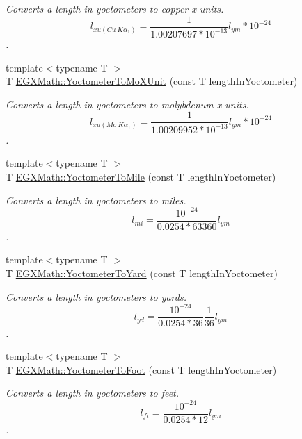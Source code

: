 \begin{DoxyCompactItemize}
\begin{DoxyCompactList}\small\item\em Converts a length in yoctometers to copper x units. \[ l_{xu(Cu\ K\alpha_1)}= \frac{1}{1.00207697*10^{-13}} l_{ym} * 10^{-24}\]. \end{DoxyCompactList}\item 
{\footnotesize template$<$typename T $>$ }\\T \mbox{\hyperlink{group___e_g_x_math-_conversions-_length_conversions-_s_i-_yoctometer-_non-_s_i_ga6a6a1fb3ecc97e377fc728c03327048e}{E\+G\+X\+Math\+::\+Yoctometer\+To\+Mo\+X\+Unit}} (const T length\+In\+Yoctometer)
\begin{DoxyCompactList}\small\item\em Converts a length in yoctometers to molybdenum x units. \[ l_{xu(Mo\ K\alpha_1)}=\frac{1}{1.00209952*10^{-13}} l_{ym} * 10^{-24}\]. \end{DoxyCompactList}\item 
{\footnotesize template$<$typename T $>$ }\\T \mbox{\hyperlink{group___e_g_x_math-_conversions-_length_conversions-_s_i-_yoctometer-_imperial_gae40e8cf52937348b127013a3dbe89105}{E\+G\+X\+Math\+::\+Yoctometer\+To\+Mile}} (const T length\+In\+Yoctometer)
\begin{DoxyCompactList}\small\item\em Converts a length in yoctometers to miles. \[ l_{mi}=\frac{10^{-24}}{0.0254 * 63360} l_{ym} \]. \end{DoxyCompactList}\item 
{\footnotesize template$<$typename T $>$ }\\T \mbox{\hyperlink{group___e_g_x_math-_conversions-_length_conversions-_s_i-_yoctometer-_imperial_gaa9c695208d05175797ee88adef7bd5f2}{E\+G\+X\+Math\+::\+Yoctometer\+To\+Yard}} (const T length\+In\+Yoctometer)
\begin{DoxyCompactList}\small\item\em Converts a length in yoctometers to yards. \[ l_{yd}= \frac{10^{-24}}{0.0254 * 36} \frac{1}{36} l_{ym} \]. \end{DoxyCompactList}\item 
{\footnotesize template$<$typename T $>$ }\\T \mbox{\hyperlink{group___e_g_x_math-_conversions-_length_conversions-_s_i-_yoctometer-_imperial_gad8cb5223284af20fc0d29fefa17ec091}{E\+G\+X\+Math\+::\+Yoctometer\+To\+Foot}} (const T length\+In\+Yoctometer)
\begin{DoxyCompactList}\small\item\em Converts a length in yoctometers to feet. \[ l_{ft}= \frac{10^{-24}}{0.0254 * 12} l_{ym} \]. \end{DoxyCompactList}\item 

\end{DoxyCompactItemize}
